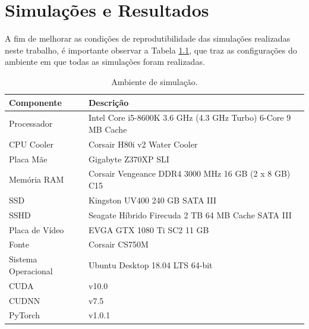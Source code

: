\chapter{Simulações e Resultados}
\label{cha:results}

A fim de melhorar as condições de reprodutibilidade das simulações realizadas neste trabalho, é importante observar a Tabela \ref{tab:results_pc_specs}, que traz as configurações do ambiente em que todas as simulações foram realizadas.

\begin{table}[H]
    \centering
    \caption{Ambiente de simulação.}
    \begin{tabular}{ll}
        \toprule
        \textbf{Componente} &   \textbf{Descrição}\\
        \midrule
        Processador         &   Intel Core i5-8600K 3.6 GHz (4.3 GHz Turbo) 6-Core 9 MB Cache\\
        CPU Cooler          &   Corsair H80i v2 Water Cooler\\
        Placa Mãe           &   Gigabyte Z370XP SLI\\
        Memória RAM         &   Corsair Vengeance DDR4 3000 MHz 16 GB (2 x 8 GB) C15\\
        SSD                 &   Kingston UV400 240 GB SATA III\\
        SSHD                &   Seagate Híbrido Firecuda 2 TB 64 MB Cache SATA III\\
        Placa de Vídeo      &   EVGA GTX 1080 Ti SC2 11 GB\\
        Fonte               &   Corsair CS750M\\
        Sistema Operacional &   Ubuntu Desktop 18.04 LTS 64-bit\\
        CUDA                &   v10.0\\
        CUDNN               &   v7.5\\
        PyTorch             &   v1.0.1\\
        \bottomrule
    \end{tabular}
    \label{tab:results_pc_specs}
\end{table}







